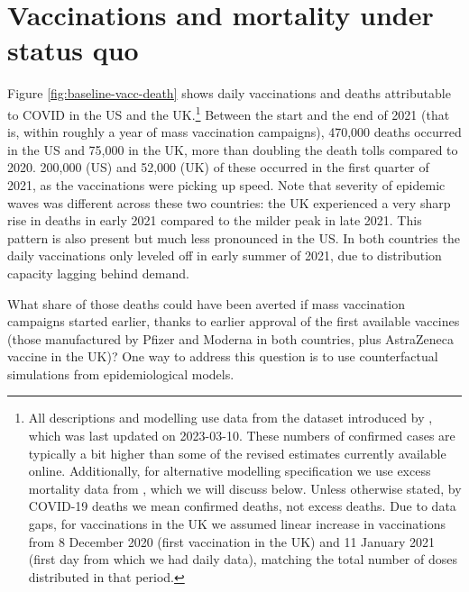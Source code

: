 \documentclass{article}
\begin{document}
\section{Vaccinations and mortality under status quo}\label{vaccinations-and-mortality-under-status-quo}

Figure \ref{fig:baseline-vacc-death} shows daily vaccinations and deaths attributable to COVID in the US and the UK.\footnote{All descriptions and modelling use data from the dataset introduced by \citet{Dong2020Aninteractive}, which was last updated on 2023-03-10. These numbers of confirmed cases are typically a bit higher than some of the revised estimates currently available online. Additionally, for alternative modelling specification we use excess mortality data from \citet{solstadPandemicTrueDeath2023}, which we will discuss below. Unless otherwise stated, by COVID-19 deaths we mean confirmed deaths, not excess deaths. Due to data gaps, for vaccinations in the UK we assumed linear increase in vaccinations from 8 December 2020 (first vaccination in the UK) and 11 January 2021 (first day from which we had daily data), matching the total number of doses distributed in that period.} Between the start and the end of 2021 (that is, within roughly a year of mass vaccination campaigns), 470,000 deaths occurred in the US and 75,000 in the UK, more than doubling the death tolls compared to 2020. 200,000 (US) and 52,000 (UK) of these occurred in the first quarter of 2021, as the vaccinations were picking up speed. Note that severity of epidemic waves was different across these two countries: the UK experienced a very sharp rise in deaths in early 2021 compared to the milder peak in late 2021. This pattern is also present but much less pronounced in the US. In both countries the daily vaccinations only leveled off in early summer of 2021, due to distribution capacity lagging behind demand.

What share of those deaths could have been averted if mass vaccination campaigns started earlier, thanks to earlier approval of the first available vaccines (those manufactured by Pfizer and Moderna in both countries, plus AstraZeneca vaccine in the UK)? One way to address this question is to use counterfactual simulations from epidemiological models.
\end{document}
